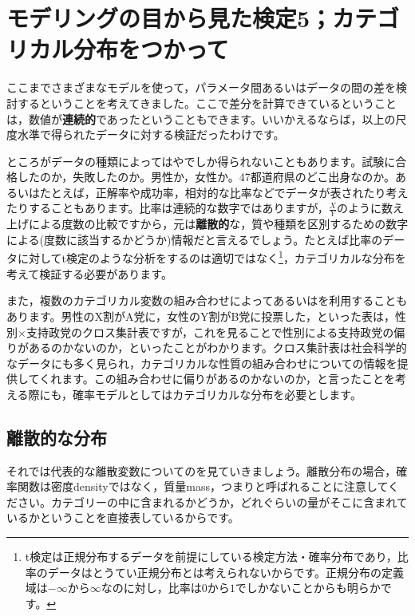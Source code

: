 \documentclass{ltjsbook}
\begin{document}
\VerbatimFootnotes
\chapter{モデリングの目から見た検定5；カテゴリカル分布をつかって}
\label{x23_modeling5}
ここまでさまざまなモデルを使って，パラメータ間あるいはデータの間の差を検討するということを考えてきました。ここで差分を計算できているということは，数値が\textbf{連続的}であったということもできます。いいかえるならば，以上の尺度水準で得られたデータに対する検証だったわけです。

ところがデータの種類によってはやでしか得られないこともあります。試験に合格したのか，失敗したのか。男性か，女性か。47都道府県のどこ出身なのか。あるいはたとえば，正解率や成功率，相対的な比率などでデータが表されたり考えたりすることもあります。比率は連続的な数字ではありますが，$\frac{X}{Y}$のように数え上げによる度数の比較ですから，元は\textbf{離散的}な，質や種類を区別するための数字による(度数に該当するかどうか)情報だと言えるでしょう。たとえば比率のデータに対してt検定のような分析をするのは適切ではなく\footnote{t検定は正規分布するデータを前提にしている検定方法・確率分布であり，比率のデータはとうてい正規分布とは考えられないからです。正規分布の定義域は$-\infty$から$\infty$なのに対し，比率は$0$から$1$でしかないことからも明らかです。}，カテゴリカルな分布を考えて検証する必要があります。

また，複数のカテゴリカル変数の組み合わせによってあるいはを利用することもあります。男性のX割がA党に，女性のY割がB党に投票した，といった表は，性別$\times$支持政党のクロス集計表ですが，これを見ることで性別による支持政党の偏りがあるのかないのか，といったことがわかります。クロス集計表は社会科学的なデータにも多く見られ，カテゴリカルな性質の組み合わせについての情報を提供してくれます。この組み合わせに偏りがあるのかないのか，と言ったことを考える際にも，確率モデルとしてはカテゴリカルな分布を必要とします。

\section{離散的な分布}
\label{DDist}
それでは代表的な離散変数についてのを見ていきましょう。離散分布の場合，確率関数は密度densityではなく，質量mass，つまりと呼ばれることに注意してください。カテゴリーの中に含まれるかどうか，どれぐらいの量がそこに含まれているかということを直接表しているからです。
\end{document}
